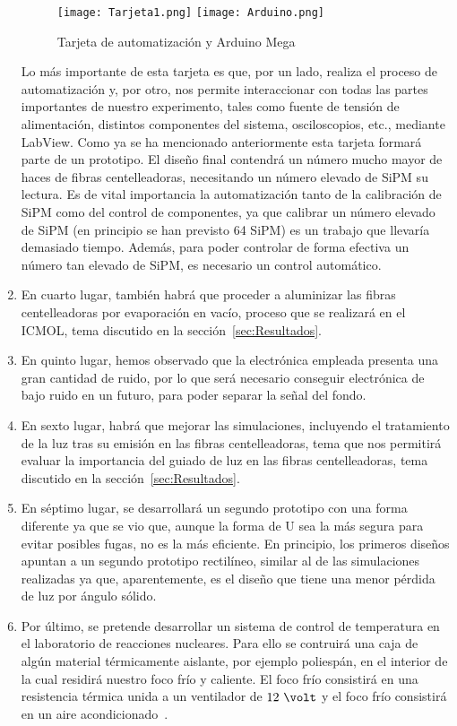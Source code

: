 \begin{enumerate}
\begin{figure}[htb]
\centering
{
\texttt{[image: Tarjeta1.png]} 
}
{
\texttt{[image: Arduino.png]} 
}
\caption{Tarjeta de automatización y Arduino Mega\label{arduino}}
\end{figure} 

Lo más importante de esta tarjeta es que, por un lado, realiza el proceso de automatización y, por otro, nos permite interaccionar con todas las partes importantes de nuestro experimento, tales como fuente de tensión de alimentación,  distintos componentes del sistema, osciloscopios, etc., mediante LabView.
Como ya se ha mencionado anteriormente esta tarjeta formará parte de un prototipo. El diseño final contendrá un número mucho mayor de haces de fibras centelleadoras, necesitando un número elevado de SiPM su lectura. Es de vital importancia  la automatización tanto de la calibración de SiPM como del control de componentes, ya que calibrar un número elevado de SiPM (en principio se han previsto 64 SiPM) es un trabajo que llevaría demasiado tiempo. Además, para poder controlar de forma efectiva un número tan elevado de SiPM, es necesario un control automático. 

\item {} En cuarto lugar, también habrá que proceder a aluminizar las fibras centelleadoras  por evaporación en vacío, proceso que se realizará en el ICMOL, tema discutido en la sección~\ref{sec:Resultados}.

\item {} En quinto lugar, hemos observado que la electrónica empleada presenta una gran cantidad de ruido, por lo que será necesario conseguir electrónica de bajo ruido en un futuro, para poder separar la señal del fondo.

\item {} En sexto lugar, habrá que mejorar las simulaciones, incluyendo el  tratamiento de la luz tras su emisión en las fibras centelleadoras, tema que nos permitirá evaluar la importancia del guiado de luz en las fibras centelleadoras, tema discutido en la sección~\ref{sec:Resultados}.

\item {} En séptimo lugar, se desarrollará un segundo prototipo con una forma diferente ya que se vio que, aunque la forma de U sea la más segura para evitar posibles fugas, no es la más eficiente. En principio, los primeros diseños apuntan a un segundo prototipo rectilíneo, similar al de las simulaciones realizadas ya que, aparentemente, es el diseño que tiene una menor pérdida de luz por ángulo sólido.

\item {} Por último, se pretende desarrollar un sistema de control de temperatura  en el laboratorio de reacciones nucleares. Para ello se contruirá una caja de algún material térmicamente aislante, por ejemplo poliespán, en el interior de la cual residirá nuestro foco frío y caliente. El foco frío consistirá en una resistencia térmica unida  a un ventilador de $12~\volt$ y el foco frío consistirá en un aire acondicionado~\cite{Camara}.

\end{enumerate}